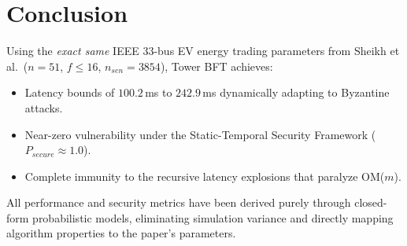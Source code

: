 \documentclass[10pt,twocolumn,letterpaper]{article}
\begin{document}
\section{Conclusion}

Using the \emph{exact same} IEEE 33-bus EV energy trading parameters from
Sheikh et al.\ ($n{=}51$, $f{\leq}16$, $n_{sen}{=}3854$), Tower BFT achieves:
\begin{itemize}
\item Latency bounds of $100.2$\,ms to $242.9$\,ms dynamically adapting to Byzantine attacks.
\item Near-zero vulnerability under the Static-Temporal Security Framework ($P_{secure} \approx 1.0$).
\item Complete immunity to the recursive latency explosions that paralyze OM($m$).
\end{itemize}

All performance and security metrics have been derived purely through closed-form probabilistic models, eliminating simulation variance and directly mapping algorithm properties to the paper's parameters.
\end{document}
